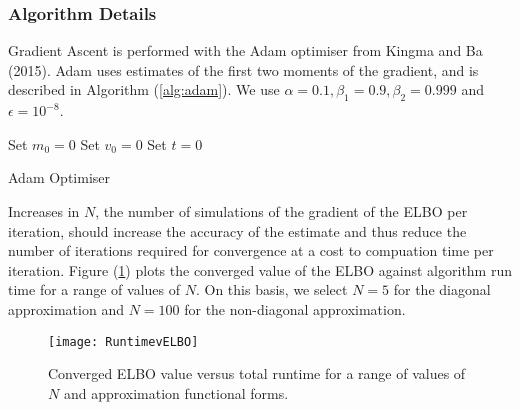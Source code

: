 \documentclass[12pt,a4paper]{article}%
\numberwithin{equation}{section}
\begin{document}
\subsubsection{Algorithm Details}

Gradient Ascent is performed with the Adam optimiser from Kingma and Ba (2015). Adam uses estimates of the first two moments of the gradient, and is described in Algorithm (\ref{alg:adam}). We use $\alpha = 0.1, \beta_1 = 0.9, \beta_2 = 0.999$ and $\epsilon = 10^{-8}$.

\begin{algorithm}[H]
 Set $m_0 = 0$\;
 Set $v_0 = 0$\;
 Set $t = 0$\;
 \caption{Adam Optimiser}
  \label{alg:adam}
\end{algorithm}

Increases in $N$, the number of simulations of the gradient of the ELBO per iteration, should increase the accuracy of the estimate and thus reduce the number of iterations required for convergence at a cost to compuation time per iteration. Figure (\ref{fig:RuntimeELBO}) plots the converged value of the ELBO against algorithm run time for a range of values of $N$. On this basis, we select $N = 5$ for the diagonal approximation and $N = 100$ for the non-diagonal approximation.

\begin{figure}[h]
\centering
\texttt{[image: RuntimevELBO]}
\caption{Converged ELBO value versus total runtime for a range of values of $N$ and approximation functional forms.}
\label{fig:RuntimeELBO}
\end{figure}
\end{document}
